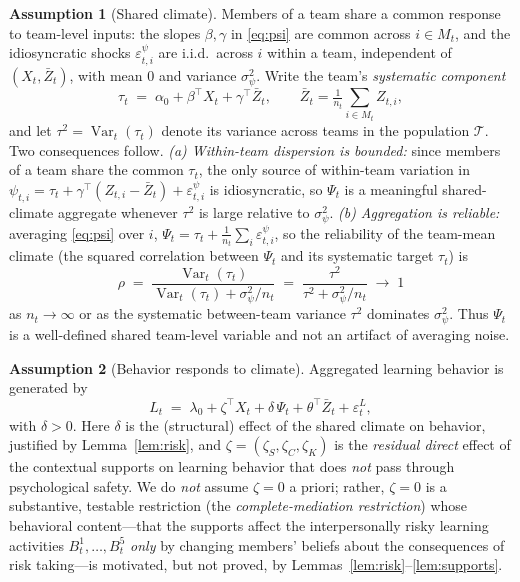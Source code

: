 \documentclass{amsart}
\theoremstyle{definition}
\newtheorem{assumption}{Assumption}
\theoremstyle{remark}
\begin{document}
\begin{assumption}[Shared climate]\label{ass:share}
Members of a team share a common response to team-level inputs: the slopes
$\beta,\gamma$ in \eqref{eq:psi} are common across $i\in M_t$, and the
idiosyncratic shocks $\varepsilon^{\psi}_{t,i}$ are i.i.d.\ across $i$
within a team, independent of $(X_t,\bar Z_t)$, with mean $0$ and variance
$\sigma^2_\psi$. Write the team's \emph{systematic component}
\[
\tau_t \;=\; \alpha_0+\beta^\top X_t+\gamma^\top\bar Z_t,
\qquad
\bar Z_t=\tfrac1{n_t}\textstyle\sum_{i\in M_t} Z_{t,i},
\]
and let $\tau^2=\operatorname{Var}_{t}(\tau_t)$ denote its variance across
teams in the population $\mathcal T$. Two consequences follow.
\emph{(a) Within-team dispersion is bounded:} since members of a team share
the common $\tau_t$, the only source of within-team variation in
$\psi_{t,i}=\tau_t+\gamma^\top(Z_{t,i}-\bar Z_t)+\varepsilon^{\psi}_{t,i}$
is idiosyncratic, so $\Psi_t$ is a meaningful shared-climate aggregate
whenever $\tau^2$ is large relative to $\sigma^2_\psi$.
\emph{(b) Aggregation is reliable:} averaging \eqref{eq:psi} over $i$,
$\Psi_t=\tau_t+\tfrac1{n_t}\sum_i\varepsilon^{\psi}_{t,i}$, so the
reliability of the team-mean climate (the squared correlation between
$\Psi_t$ and its systematic target $\tau_t$) is
\[
\rho \;=\;
\frac{\operatorname{Var}_t(\tau_t)}
     {\operatorname{Var}_t(\tau_t)+\sigma^2_\psi/n_t}
\;=\;\frac{\tau^2}{\tau^2+\sigma^2_\psi/n_t}\;\longrightarrow\;1
\]
as $n_t\to\infty$ or as the systematic between-team variance $\tau^2$
dominates $\sigma^2_\psi$. Thus $\Psi_t$ is a well-defined shared
team-level variable and not an artifact of averaging noise.
\end{assumption}

\begin{assumption}[Behavior responds to climate]%
\label{ass:behavior}
Aggregated learning behavior is generated by
\begin{equation}\label{eq:L}
L_t \;=\; \lambda_0 + \zeta^{\top}X_t + \delta\,\Psi_t + \theta^{\top}\bar Z_t
          + \varepsilon^{L}_t,
\end{equation}
with $\delta>0$. Here $\delta$ is the (structural) effect of the shared
climate on behavior, justified by Lemma~\ref{lem:risk}, and
$\zeta=(\zeta_S,\zeta_C,\zeta_K)$ is the \emph{residual direct} effect of
the contextual supports on learning behavior that does \emph{not} pass
through psychological safety. We do \emph{not} assume $\zeta=0$ a priori;
rather, $\zeta=0$ is a substantive, testable restriction (the
\emph{complete-mediation restriction}) whose behavioral content---that the
supports affect the interpersonally risky learning activities
$B_t^1,\dots,B_t^5$ \emph{only} by changing members' beliefs about the
consequences of risk taking---is motivated, but not proved, by
Lemmas~\ref{lem:risk}--\ref{lem:supports}.
\end{assumption}
\end{document}
